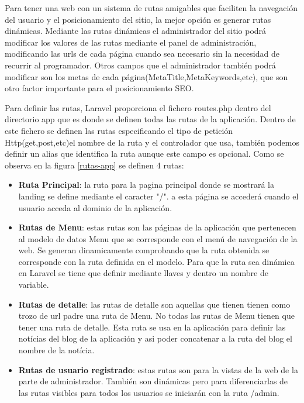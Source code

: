 Para tener una web con un sistema de rutas amigables que faciliten la navegación del usuario y el posicionamiento del sitio, la mejor opción es generar rutas dinámicas. Mediante las rutas dinámicas el administrador del sitio podrá modificar los valores de las rutas mediante el panel de administración, modificando las urls de cada página cuando sea necesario sin la necesidad de recurrir al programador. Otros campos que el administrador también podrá modificar son los metas de cada página(MetaTitle,MetaKeywords,etc), que son otro factor importante para el posicionamiento SEO.

\vspace{5 mm}

Para definir las rutas, Laravel proporciona el fichero routes.php dentro del directorio app que es donde se definen todas las rutas de la aplicación. Dentro de este fichero se definen las rutas especificando el tipo de petición Http(get,post,etc)el nombre de la ruta y el controlador que usa, también podemos definir un alias que identifica la ruta aunque este campo es opcional. Como se observa en la figura \ref{rutas-app} se definen 4 rutas:

\begin{itemize}

\item \textbf{Ruta Principal}: la ruta para la pagina principal donde se mostrará la landing se define mediante el caracter "/". a esta página se accederá cuando el usuario acceda al dominio de la aplicación.

\item \textbf{Rutas de Menu}: estas rutas son las páginas de la aplicación que pertenecen al modelo de datos Menu que se corresponde con el menú de navegación de la web. Se generan dinamicamente comprobando que la ruta obtenida se corresponde con la ruta definida en el modelo. Para que la ruta sea dinámica en Laravel se tiene que definir mediante llaves y dentro un nombre de variable.

\item \textbf{Rutas de detalle}: las rutas de detalle son aquellas que tienen tienen como trozo de url padre una ruta de Menu. No todas las rutas de Menu tienen que tener una ruta de detalle. Esta ruta se usa en la aplicación para definir las notícias del blog de la aplicación y asi poder concatenar a la ruta del blog el nombre de la notícia.

\item \textbf{Rutas de usuario registrado}: estas rutas son para la vistas de la web de la parte de administrador. También son dinámicas pero para diferenciarlas de las rutas visibles para todos los usuarios se iniciarán con la ruta /admin.

\end{itemize}


